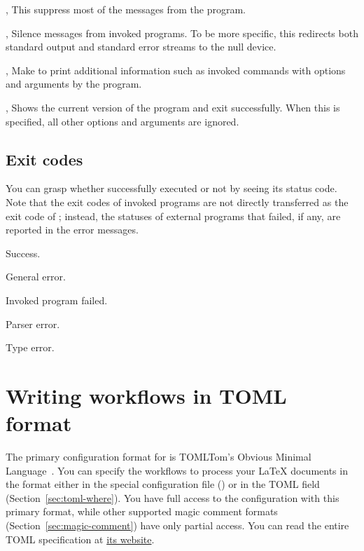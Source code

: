 \documentclass[draft]{llmk-doc}
\begin{document}
\begin{clopt}{, }
This suppress most of the messages from the program.
\end{clopt}

\begin{clopt}{, }
Silence messages from invoked programs. To be more specific, this redirects
both standard output and standard error streams to the null device.
\end{clopt}

\begin{clopt}{, }
Make  to print additional information such as invoked commands
with options and arguments by the program.
\end{clopt}

\begin{clopt}{, }
Shows the current version of the program and exit successfully. When this is
specified, all other options and arguments are ignored.
\end{clopt}

\subsection{Exit codes}

You can grasp whether  successfully executed or not by seeing its
status code. Note that the exit codes of invoked programs are not directly
transferred as the exit code of ; instead, the statuses of external
programs that failed, if any, are reported in the error messages.
%
\begin{description}[left=2em]
\item[\code{0}]
  Success.
\item[\code{1}]
  General error.
\item[\code{2}]
  Invoked program failed.
\item[\code{3}]
  Parser error.
\item[\code{4}]
  Type error.
\end{description}

\section{Writing workflows in TOML format}
\label{sec:toml}

The primary configuration format for  is TOML\Dash Tom's Obvious
Minimal Language~\cite{toml}. You can specify the workflows to process your
{\LaTeX} documents in the format either in the special configuration file
() or in the TOML field (Section~\ref{sec:toml-where}). You
have full access to the  configuration with this primary format,
while other supported magic comment formats (Section~\ref{sec:magic-comment})
have only partial access. You can read the entire TOML specification at
\href{https://toml.io/}{its website}.
\end{document}

